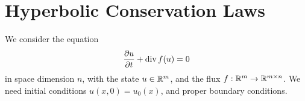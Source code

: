 








% 

\chapter{Hyperbolic Conservation Laws}


We consider the equation
$$
\frac{\partial u}{\partial t} + \operatorname{div} f(u) = 0
$$
in space dimension $n$, with the state $u \in {\mathbb R}^m$, and the 
flux $f : {\mathbb R}^m \rightarrow {\mathbb R}^{m \times n}$.  
We need initial conditions $u(x,0) = u_0(x)$, and proper boundary conditions.
\medskip 

